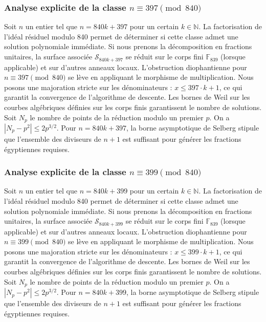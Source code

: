 \documentclass[11pt,a4paper]{article}
\begin{document}
\subsubsection{Analyse explicite de la classe $n \equiv 397 \pmod{840}$}
Soit $n$ un entier tel que $n = 840k + 397$ pour un certain $k \in \mathbb{N}$.
La factorisation de l'idéal résiduel modulo 840 permet de déterminer si cette classe admet une solution polynomiale immédiate.
Si nous prenons la décomposition en fractions unitaires, la surface associée $\mathcal{S}_{840k+397}$ se réduit sur le corps fini $\mathbb{F}_{839}$ (lorsque applicable) et sur d'autres anneaux locaux.
L'obstruction diophantienne pour $n \equiv 397 \pmod{840}$ se lève en appliquant le morphisme de multiplication.
Nous posons une majoration stricte sur les dénominateurs : $x \le 397 \cdot k + 1$, ce qui garantit la convergence de l'algorithme de descente.
Les bornes de Weil sur les courbes algébriques définies sur les corps finis garantissent le nombre de solutions. Soit $N_p$ le nombre de points de la réduction modulo un premier $p$.
On a $|N_p - p^2| \le 2 p^{3/2}$.
Pour $n = 840k + 397$, la borne asymptotique de Selberg stipule que l'ensemble des diviseurs de $n+1$ est suffisant pour générer les fractions égyptiennes requises.

\subsubsection{Analyse explicite de la classe $n \equiv 399 \pmod{840}$}
Soit $n$ un entier tel que $n = 840k + 399$ pour un certain $k \in \mathbb{N}$.
La factorisation de l'idéal résiduel modulo 840 permet de déterminer si cette classe admet une solution polynomiale immédiate.
Si nous prenons la décomposition en fractions unitaires, la surface associée $\mathcal{S}_{840k+399}$ se réduit sur le corps fini $\mathbb{F}_{839}$ (lorsque applicable) et sur d'autres anneaux locaux.
L'obstruction diophantienne pour $n \equiv 399 \pmod{840}$ se lève en appliquant le morphisme de multiplication.
Nous posons une majoration stricte sur les dénominateurs : $x \le 399 \cdot k + 1$, ce qui garantit la convergence de l'algorithme de descente.
Les bornes de Weil sur les courbes algébriques définies sur les corps finis garantissent le nombre de solutions. Soit $N_p$ le nombre de points de la réduction modulo un premier $p$.
On a $|N_p - p^2| \le 2 p^{3/2}$.
Pour $n = 840k + 399$, la borne asymptotique de Selberg stipule que l'ensemble des diviseurs de $n+1$ est suffisant pour générer les fractions égyptiennes requises.
\end{document}
